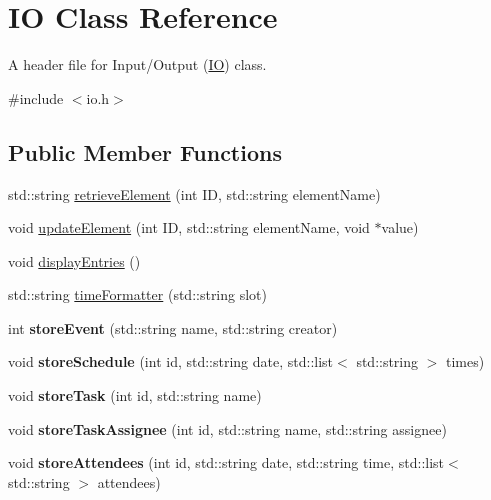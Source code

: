 \hypertarget{classIO}{\section{I\-O Class Reference}
\label{classIO}
}


A header file for Input/\-Output (\hyperlink{classIO}{I\-O}) class.  




{\ttfamily \#include $<$io.\-h$>$}

\subsection*{Public Member Functions}
\begin{DoxyCompactItemize}
\item 
std\-::string \hyperlink{classIO_a3829dc8ad91e1f2d560be799b6d9b04d}{retrieve\-Element} (int I\-D, std\-::string element\-Name)
\item 
void \hyperlink{classIO_a11fdb7d4afa830fa1441fbf566f73432}{update\-Element} (int I\-D, std\-::string element\-Name, void $\ast$value)
\item 
void \hyperlink{classIO_a48e9febfbb2c6c3e01b467fd030c2529}{display\-Entries} ()
\item 
std\-::string \hyperlink{classIO_ad78c42847c70915fe94bddd25f716859}{time\-Formatter} (std\-::string slot)
\item 
\hypertarget{classIO_ac9a8c18ea44f8ced444effc51633e4d7}{int {\bfseries store\-Event} (std\-::string name, std\-::string creator)}\label{classIO_ac9a8c18ea44f8ced444effc51633e4d7}

\item 
\hypertarget{classIO_a9030b5cd77c0b621f8ecd36d1bc6b36d}{void {\bfseries store\-Schedule} (int id, std\-::string date, std\-::list$<$ std\-::string $>$ times)}\label{classIO_a9030b5cd77c0b621f8ecd36d1bc6b36d}

\item 
\hypertarget{classIO_ad3e9360377df2dfaa223e36aa4a8edde}{void {\bfseries store\-Task} (int id, std\-::string name)}\label{classIO_ad3e9360377df2dfaa223e36aa4a8edde}

\item 
\hypertarget{classIO_a3b1673598595b2140f5f893d023813be}{void {\bfseries store\-Task\-Assignee} (int id, std\-::string name, std\-::string assignee)}\label{classIO_a3b1673598595b2140f5f893d023813be}

\item 
\hypertarget{classIO_ae1b8fcfab070b9af2dcd910c1cc7eb4e}{void {\bfseries store\-Attendees} (int id, std\-::string date, std\-::string time, std\-::list$<$ std\-::string $>$ attendees)}\label{classIO_ae1b8fcfab070b9af2dcd910c1cc7eb4e}

\end{DoxyCompactItemize}

